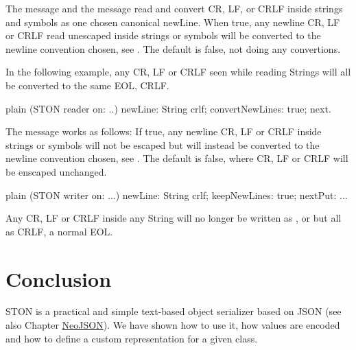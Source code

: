 \documentclass[10pt,twoside,english]{_support/latex/sbabook/sbabook}
\begin{document}
The message  and the message  read and convert CR, LF, or CRLF inside strings and symbols as
one chosen canonical newLine. When true, any newline CR, LF or CRLF read unescaped inside strings or symbols will be converted to the newline convention chosen,
see . The default is false, not doing any convertions.

In the following example, any CR, LF or CRLF seen while reading Strings will all be converted to the same EOL, CRLF.

\begin{displaycode}{plain}
(STON reader on: ..)
   newLine: String crlf;
   convertNewLines: true;
   next.
\end{displaycode}

The message  works as follows: If true, any newline CR, LF or CRLF inside strings or symbols will not be escaped but will
instead be converted to the newline convention chosen, see . The default is false, where CR, LF or CRLF will be enscaped unchanged.

\begin{displaycode}{plain}
(STON writer on: ...)
   newLine: String crlf;
   keepNewLines: true;
   nextPut: ...
\end{displaycode}

Any CR, LF or CRLF inside any String will no longer be written as ,  or  but all as CRLF, a normal EOL.
\section{Conclusion}
STON is a practical and simple text-based object serializer based on
JSON (see also Chapter \hyperref[cha:JSON]{NeoJSON}).
We have shown how to use it, how values are encoded and how to define
a custom representation for a given class.
\end{document}
